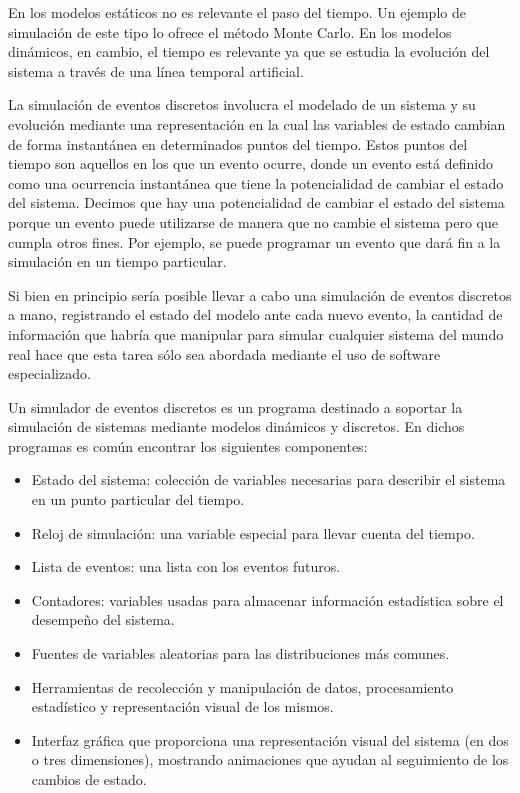 En los modelos estáticos no es relevante el paso del tiempo. Un ejemplo de
simulación de este tipo lo ofrece el método Monte Carlo. En los modelos
dinámicos, en cambio, el tiempo es relevante ya que se estudia la evolución del
sistema a través de una línea temporal artificial.

La simulación de eventos discretos involucra el modelado de un sistema y su
evolución mediante una representación en la cual las variables de estado
cambian de forma instantánea en determinados puntos del tiempo. Estos puntos
del tiempo son aquellos en los que un evento ocurre, donde un evento está
definido como una ocurrencia instantánea que tiene la potencialidad de cambiar
el estado del sistema. Decimos que hay una potencialidad de cambiar el estado
del sistema porque un evento puede utilizarse de manera que no cambie el
sistema pero que cumpla otros fines. Por ejemplo, se puede programar un evento
que dará fin a la simulación en un tiempo particular.

Si bien en principio sería posible llevar a cabo una simulación de eventos
discretos a mano, registrando el estado del modelo ante cada nuevo evento, la
cantidad de información que habría que manipular para simular cualquier sistema
del mundo real hace que esta tarea sólo sea abordada mediante el uso de
software especializado.

Un simulador de eventos discretos es un programa destinado a soportar la
simulación de sistemas mediante modelos dinámicos y discretos. En dichos
programas es común encontrar los siguientes componentes:

\begin{itemize}
    \item Estado del sistema: colección de variables necesarias para describir
    el sistema en un punto particular del tiempo.

    \item Reloj de simulación: una variable especial para llevar cuenta del
    tiempo.

    \item Lista de eventos: una lista con los eventos futuros.

    \item Contadores: variables usadas para almacenar información estadística
    sobre el desempeño del sistema.

    \item Fuentes de variables aleatorias para las distribuciones más comunes.

    \item Herramientas de recolección y manipulación de datos, procesamiento
    estadístico y representación visual de los mismos.

    \item Interfaz gráfica que proporciona una representación visual del
    sistema (en dos o tres dimensiones), mostrando animaciones que ayudan al
    seguimiento de los cambios de estado.
\end{itemize}

